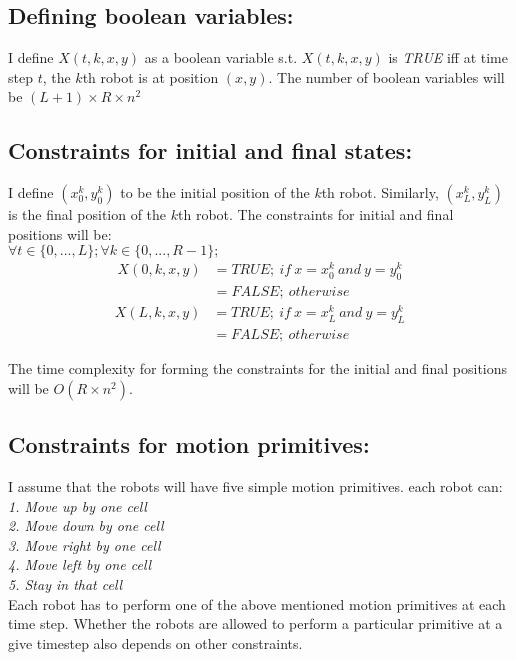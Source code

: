 \documentclass{article}[11pt]
\begin{document}
		\subsection{Defining boolean variables:}
			I define $X(t, k, x, y)$ as a boolean variable s.t. $X(t, k, x, y)$ is \textit{TRUE} iff at time step $t$, the $k$th robot is at position $(x,y)$. The number of boolean variables will be $(L+1) \times R \times n^2$
		
		\subsection{Constraints for initial and final states:}
			I define $(x_0^k,y_0^k)$ to be the initial position of the $k$th robot.
			Similarly, $(x_L^k, y_L^k)$ is the final position of the $k$th robot.
			The constraints for initial and final positions will be: \\
			$\forall{t \in \{0,...,L\}};\forall{k \in \{0,...,R-1\}};$
			\begin{equation*}
			\begin{split}
				X(0, k, x, y) &= TRUE;\ if \ x = x_0^k \ and \ y=y_0^k\\
				                                    &= FALSE;\ otherwise
			\end{split}
			\end{equation*}
			\begin{equation*}
			\begin{split}
				X(L, k, x, y) &= TRUE;\ if \ x = x_L^k \ and \ y=y_L^k \\
				                                    &= FALSE;\ otherwise
			\end{split}
			\end{equation*}

			The time complexity for forming the constraints for the initial and final positions will be $O(R \times n^2)$.			

		\subsection{Constraints for motion primitives:}
			I assume that the robots will have five simple motion primitives. each robot can:\\
			\textit{
				1. Move up by one cell\\
				2. Move down by one cell\\
				3. Move right by one cell\\
				4. Move left by one cell\\
				5. Stay in that cell\\ 
			}
			Each robot has to perform one of the above mentioned motion primitives at each time step. Whether the robots are allowed to perform a particular primitive at a give timestep also depends on other constraints.\\
\end{document}
